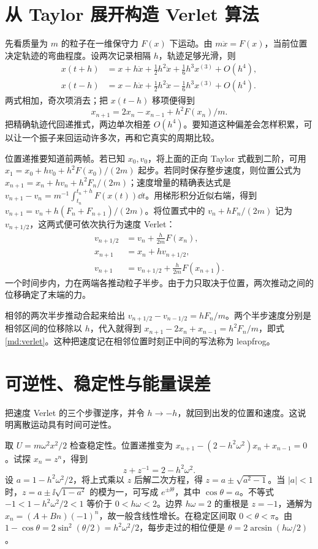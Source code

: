 \section{从 Taylor 展开构造 Verlet 算法}
先看质量为 $m$ 的粒子在一维保守力 $F(x)$ 下运动。由 $m\ddot x=F(x)$，当前位置决定轨迹的弯曲程度。设两次记录相隔 $h$，轨迹足够光滑，则
\begin{align}
x(t+h)&=x+h\dot x+\tfrac12h^2\ddot x+\tfrac16h^3x^{(3)}+O(h^4),\\
x(t-h)&=x-h\dot x+\tfrac12h^2\ddot x-\tfrac16h^3x^{(3)}+O(h^4).
\end{align}
两式相加，奇次项消去；把 $x(t-h)$ 移项便得到
\begin{equation}\label{md:verlet}
x_{n+1}=2x_n-x_{n-1}+h^2F(x_n)/m.
\end{equation}
把精确轨迹代回递推式，两边单次相差 $O(h^4)$。要知道这种偏差会怎样积累，可以让一个振子来回运动许多次，再和它真实的周期比较。

位置递推要知道前两帧。若已知 $x_0,v_0$，将上面的正向 Taylor 式截到二阶，可用 $x_1=x_0+hv_0+h^2F(x_0)/(2m)$ 起步。若同时保存整步速度，则位置公式为 $x_{n+1}=x_n+hv_n+h^2F_n/(2m)$；速度增量的精确表达式是 $v_{n+1}-v_n=m^{-1}\int_{t_n}^{t_n+h}F(x(t))\dd t$。用梯形积分近似右端，得到 $v_{n+1}=v_n+h(F_n+F_{n+1})/(2m)$。将位置式中的 $v_n+hF_n/(2m)$ 记为 $v_{n+1/2}$，这两式便可依次执行为速度 Verlet：
\begin{align}
v_{n+1/2}&=v_n+\frac h{2m}F(x_n),\\
x_{n+1}&=x_n+h v_{n+1/2},\\
v_{n+1}&=v_{n+1/2}+\frac h{2m}F(x_{n+1}).
\end{align}
一个时间步内，力在两端各推动粒子半步。由于力只取决于位置，两次推动之间的位移确定了末端的力。

相邻的两次半步推动合起来给出 $v_{n+1/2}-v_{n-1/2}=hF_n/m$。两个半步速度分别是相邻区间的位移除以 $h$，代入就得到 $x_{n+1}-2x_n+x_{n-1}=h^2F_n/m$，即式\eqref{md:verlet}。这种把速度记在相邻位置时刻正中间的写法称为 leapfrog。

\section{可逆性、稳定性与能量误差}\label{md:stability}
把速度 Verlet 的三个步骤逆序，并令 $h\to-h$，就回到出发的位置和速度。这说明离散运动具有时间可逆性。

取 $U=m\omega^2x^2/2$ 检查稳定性。位置递推变为 $x_{n+1}-(2-h^2\omega^2)x_n+x_{n-1}=0$。试探 $x_n=z^n$，得到
\begin{equation}
z+z^{-1}=2-h^2\omega^2.
\end{equation}
设 $a=1-h^2\omega^2/2$，将上式乘以 $z$ 后解二次方程，得 $z=a\pm\sqrt{a^2-1}$。当 $|a|<1$ 时，$z=a\pm\ii\sqrt{1-a^2}$ 的模为一，可写成 $e^{\pm\ii\theta}$，其中 $\cos\theta=a$。不等式 $-1<1-h^2\omega^2/2<1$ 等价于 $0<h\omega<2$。边界 $h\omega=2$ 的重根是 $z=-1$，通解为 $x_n=(A+Bn)(-1)^n$，故一般含线性增长。在稳定区间取 $0<\theta<\pi$。由 $1-\cos\theta=2\sin^2(\theta/2)=h^2\omega^2/2$，每步走过的相位便是 $\theta=2\arcsin(h\omega/2)$。

